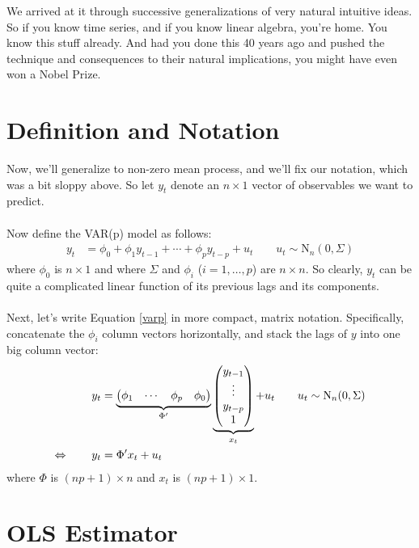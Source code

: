 \documentclass[a4paper,12pt]{scrartcl}
\begin{document}
We arrived at it through successive generalizations
of {very} natural intuitive ideas. So if you know
time series, and if you know linear algebra, you're home.
You know this stuff already. And had you done this 40 years
ago and pushed the technique and consequences
to their natural implications, you might have even won
a Nobel Prize. 


\newpage
\section{Definition and Notation}

Now, we'll generalize to non-zero mean process, and 
we'll fix our notation, which was a bit
sloppy above.  So let $y_t$ denote
an $n\times 1$ vector of observables we
want to predict.  
\\
\\
Now define the VAR(p) model as follows:
\begin{align}
    \label{varp}
    y_t &= \phi_0 + \phi_1 y_{t-1} + \cdots + 
	\phi_p y_{t-p} + u_{t} 
	\qquad u_t \sim \text{N}_n(0, \Sigma)
\end{align}
where $\phi_0$ is $n\times 1$ and where $\Sigma$ and
$\phi_i$ ($i = 1, \ldots, p$) are $n\times n$.
So clearly, $y_t$ can be quite a complicated linear
function of its previous lags and its components.
\\
\\
Next, let's write Equation \ref{varp} in more
compact, matrix notation.  Specifically, concatenate
the $\phi_i$ column vectors horizontally, and stack the lags 
of $y$ into one big column vector:
\begin{align} 
    y_t &= \underbrace{\begin{pmatrix} \phi_1 & \cdots 
	& \phi_p & \phi_0 \end{pmatrix}}_{\Phi'}
	\underbrace{\begin{pmatrix} 
	     y_{t-1} \\ \vdots \\ y_{t-p} \\ 1
	\end{pmatrix}}_{x_t} + u_t \qquad u_t \sim \text{N}_n(0, \Sigma) 
	 \notag \\
    \Leftrightarrow \qquad y_t &= \Phi' x_t + u_t 
    \label{varvec}
\end{align} 
where $\Phi$ is $(np +1) \times n$ and $x_t$ is 
$(np+1) \times 1$.


\section{OLS Estimator}
\end{document}
